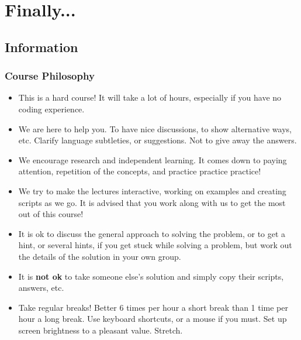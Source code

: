 \section{Finally...}
\subsection{Information}
\begin{frame}
 \frametitle{Course Philosophy}
 \begin{itemize}
  \item This is a hard course! It will take a lot of hours, especially if you have no coding experience.
  \item We are here to help you. To have nice discussions, to show alternative ways, etc. Clarify language subtleties, or suggestions. Not to give away the answers.
  \item We encourage research and independent learning. It comes down to paying attention, repetition of the concepts, and practice practice practice! 
  \item We try to make the lectures interactive, working on examples and creating scripts as we go. It is advised that you work along with us to get the most out of this course!
  \item It is ok to discuss the general approach to solving the problem, or to get a hint, or several hints, if you get stuck while solving a problem, but work out the details of the solution in your own group.
  \item It is {\textbf{not ok}} to take someone else’s solution and simply copy their scripts, answers, etc.
  \item Take regular breaks! Better 6 times per hour a short break than 1 time per hour a long break. Use keyboard shortcuts, or a mouse if you must. Set up screen brightness to a pleasant value. Stretch.
 \end{itemize}
\end{frame}

